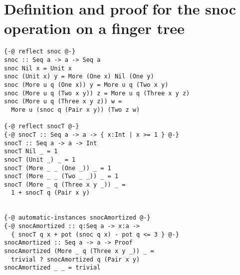 \documentclass[sigplan,screen]{acmart}
\begin{document}
\section{Definition and proof for the snoc operation on a finger tree}

\begin{lstlisting}
{-@ reflect snoc @-}
snoc :: Seq a -> a -> Seq a
snoc Nil x = Unit x
snoc (Unit x) y = More (One x) Nil (One y)
snoc (More u q (One x)) y = More u q (Two x y)
snoc (More u q (Two x y)) z = More u q (Three x y z)
snoc (More u q (Three x y z)) w =
  More u (snoc q (Pair x y)) (Two z w)

{-@ reflect snocT @-}
{-@ snocT :: Seq a -> a -> { x:Int | x >= 1 } @-}
snocT :: Seq a -> a -> Int
snocT Nil _ = 1
snocT (Unit _) _ = 1
snocT (More _ _ (One _)) _ = 1
snocT (More _ _ (Two _ _)) _ = 1
snocT (More _ q (Three x y _)) _ =
  1 + snocT q (Pair x y)


{-@ automatic-instances snocAmortized @-}
{-@ snocAmortized :: q:Seq a -> x:a ->
  { snocT q x + pot (snoc q x) - pot q <= 3 } @-}
snocAmortized :: Seq a -> a -> Proof
snocAmortized (More _ q (Three x y _)) _ =
  trivial ? snocAmortized q (Pair x y)
snocAmortized _ _ = trivial

\end{lstlisting}
\end{document}
